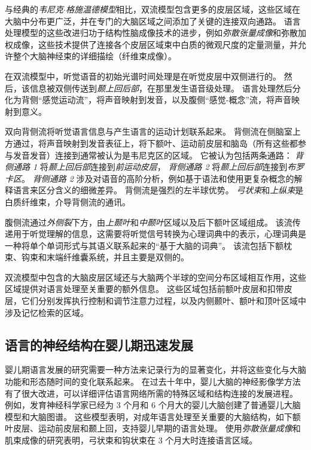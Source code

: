 与经典的\textit{韦尼克$\cdot$格施温德模型}相比，双流模型包含更多的皮层区域，这些区域在大脑中分布更广泛，并在专门的大脑区域之间添加了关键的连接双向通路。
语言处理模型的这些改进归功于结构性脑成像技术的进步，例如\textit{弥散张量成像}和弥散加权成像，这些技术提供了连接各个皮层区域束中白质的微观尺度的定量测量，并允许整个大脑神经束的详细描绘（纤维束成像）。


在双流模型中，听觉语音的初始光谱时间处理是在听觉皮层中双侧进行的。
然后，该信息被双侧传送到\textit{颞上回后部}，在那里发生语音级处理。
语言处理然后分化为背侧“感觉运动流”，将声音映射到发音，以及腹侧“感觉-概念”流，将声音映射到意义。


双向背侧流将听觉语言信息与产生语言的运动计划联系起来。
背侧流在侧脑室上方通过，将声音映射到发音表征上，将下额叶、运动前皮层和脑岛（所有这些都参与发音发音）连接到通常被认为是韦尼克区的区域。
它被认为包括两条通路：
\textit{背侧通路 1} 将\textit{颞上回后部}连接到\textit{前运动皮层}，
\textit{背侧通路 2} 将\textit{颞上回后部}连接到\textit{布罗卡区}。
\textit{背侧通路 2} 涉及对语音的高阶分析，例如基于语法和使用更复杂概念的解释语言来区分含义的细微差异。
背侧流是强烈的左半球优势。
\textit{弓状束}和\textit{上纵束}是白质纤维束，介导背侧流的通讯。


腹侧流通过\textit{外侧裂}下方，由\textit{上颞叶}和\textit{中颞叶}区域以及后下额叶区域组成。
该流传递用于听觉理解的信息，这需要将听觉信号转换为心理词典中的表示，心理词典是一种将单个单词形式与其语义联系起来的“基于大脑的词典”。
该流包括下额枕束、钩束和末端纤维囊系统，并且主要是双侧的。


双流模型中包含的大脑皮层区域还与大脑两个半球的空间分布区域相互作用，这些区域提供对语言处理至关重要的额外信息。
这些区域包括前额叶皮层和扣带皮层，它们分别发挥执行控制和调节注意力过程，以及内侧颞叶、额叶和顶叶区域中涉及记忆检索的区域。




\subsection{语言的神经结构在婴儿期迅速发展}

婴儿期语言发展的研究需要一种方法来记录行为的显著变化，并将这些变化与大脑功能和形态随时间的变化联系起来。
在过去十年中，婴儿大脑的神经影像学方法有了很大改进，可以详细评估语言网络所需的特殊区域和结构连接的发展进程。
例如，发育神经科学家已经为 3 个月和 6 个月大的婴儿大脑创建了普通婴儿大脑模型和大脑图谱。
这些模型表明，对成年语言处理至关重要的大脑结构，如下额叶皮层、运动前皮层和颞上回，支持婴儿早期的语言处理。
使用\textit{弥散张量成像}和肌束成像的研究表明，弓状束和钩状束在 3 个月大时连接语言区域。



